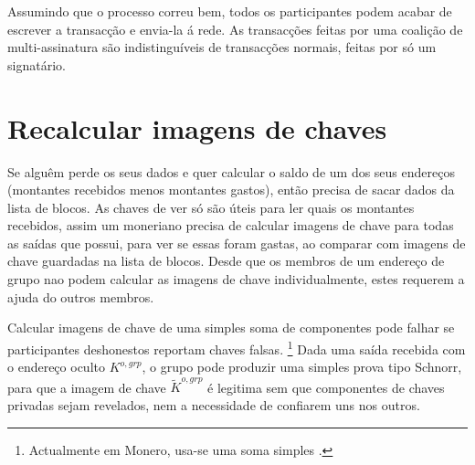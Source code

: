 Assumindo que o processo correu bem, todos os participantes podem acabar de escrever a transacção e envia-la á rede. As transacções feitas por uma coalição de multi-assinatura são indistinguíveis de transacções normais, feitas por só um signatário.   

\section{Recalcular imagens de chaves}
\label{sec:recalculating-key-images-multisig}

Se alguêm perde os seus dados e quer calcular o saldo de um dos seus endereços (montantes recebidos menos montantes gastos), então precisa de sacar dados da lista de blocos. As chaves de ver só são úteis para ler quais os montantes recebidos, assim um moneriano precisa de calcular imagens de chave para todas as saídas que possui, para ver se essas foram gastas, ao comparar com imagens de chave guardadas na lista de blocos. Desde que os membros de um endereço de grupo nao podem calcular as imagens de chave individualmente, estes requerem a ajuda do outros membros. 


Calcular imagens de chave de uma simples soma de componentes pode falhar se participantes deshonestos reportam chaves falsas.
\footnote{Actualmente em Monero, usa-se uma soma simples  .}
Dada uma saída recebida com o endereço oculto $K^{o,grp}$, o grupo pode produzir uma simples prova tipo Schnorr, para que a imagem de chave $\tilde{K}^{o,grp}$ é legitima sem que componentes de chaves privadas sejam revelados, nem a necessidade de confiarem uns nos outros.  

